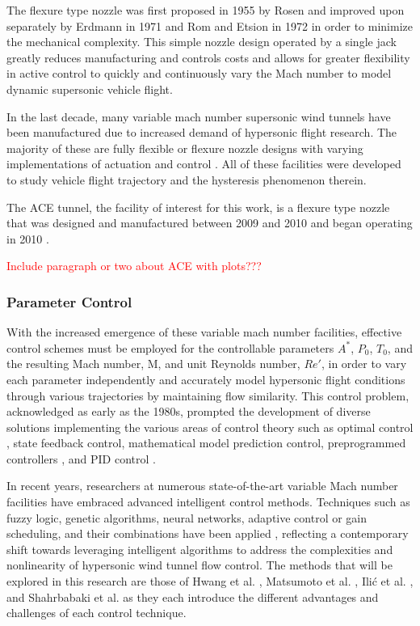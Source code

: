 The flexure type nozzle was first proposed in 1955 by Rosen \cite{rosen} and improved upon separately by Erdmann in 1971\cite{erdmann} and Rom and Etsion in 1972 \cite{erdmann,rom} in order to minimize the mechanical complexity. This simple nozzle design operated by a single jack greatly reduces manufacturing and controls costs and allows for greater flexibility in active control to quickly and continuously vary the Mach number to model dynamic supersonic vehicle flight.

In the last decade, many variable mach number supersonic wind tunnels have been manufactured due to increased demand of hypersonic flight research. The majority of these are fully flexible or flexure nozzle designs with varying implementations of actuation and control \cite{ilic-1,shahrbabaki-1,durand,laguarda,chen,guo,lv,qi,steeves}. All of these facilities were developed to study vehicle flight trajectory and the hysteresis phenomenon therein.

The ACE tunnel, the facility of interest for this work, is a flexure type nozzle that was designed and manufactured between 2009 and 2010 and began operating in 2010 \cite{ace09,ace10-calibrate,tichenor-dis}. 

\textcolor{red}{Include paragraph or two about ACE with plots???}

\subsubsection{Parameter Control}
With the increased emergence of these variable mach number facilities, effective control schemes must be employed for the controllable parameters $A^*$, $P_0$, $T_0$, and the resulting Mach number, M, and unit Reynolds number, $Re'$, in order to vary each parameter independently and accurately model hypersonic flight conditions through various trajectories by maintaining flow similarity. This control problem, acknowledged as early as the 1980s, prompted the development of diverse solutions implementing the various areas of control theory such as optimal control \cite{kraft,hwang}, state feedback control, mathematical model prediction control, preprogrammed controllers \cite{matsumoto}, and PID control \cite{fung,ilic-2,silva}.

In recent years, researchers at numerous state-of-the-art variable Mach number facilities have embraced advanced intelligent control methods. Techniques such as fuzzy logic, genetic algorithms, neural networks, adaptive control or gain scheduling, and their combinations have been applied \cite{nott,shahrbabaki-1}, reflecting a contemporary shift towards leveraging intelligent algorithms to address the complexities and nonlinearity of hypersonic wind tunnel flow control. The methods that will be explored in this research are those of Hwang et al. \cite{hwang}, Matsumoto et al. \cite{matsumoto}, Ili\'c et al. \cite{ilic-2}, and Shahrbabaki et al. \cite{shahrbabaki-1} as they each introduce the different advantages and challenges of each control technique. 

